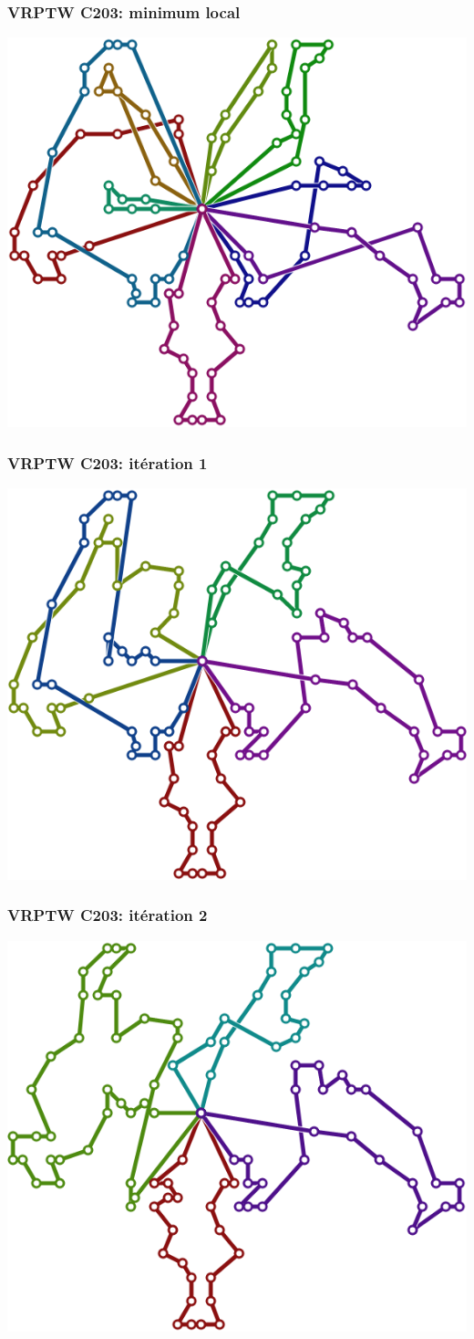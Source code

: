 \documentclass[table]{beamer}
\begin{document}
\begin{frame}
  \frametitle{VRPTW C203: minimum local}

  \centering
  \includegraphics[width=0.7\linewidth]{../article/images/C203-0}
\end{frame}

\begin{frame}
  \frametitle{VRPTW C203: itération 1}

  \centering
  \includegraphics[width=0.7\linewidth]{../article/images/C203-1}
\end{frame}

\begin{frame}
  \frametitle{VRPTW C203: itération 2}

  \centering
  \includegraphics[width=0.7\linewidth]{../article/images/C203-2}
\end{frame}
\end{document}
